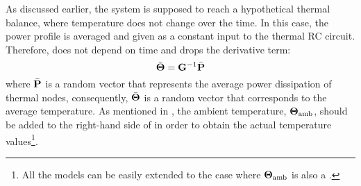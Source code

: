 As discussed earlier, the system is supposed to reach a hypothetical thermal balance, where temperature does not change over the time. In this case, the power profile is averaged and given as a constant input to the thermal RC circuit. Therefore,  does not depend on time and drops the derivative term:
\begin{equation} \equlabel{sss-fourier}
  \a{\vtemperature} = \mconductance^{-1} \a{\vpower}
\end{equation}
where $\bar{\mathbf{P}}$ is a random vector that represents the average power dissipation of thermal nodes, consequently, $\bar{\mathbf{\Theta}}$ is a random vector that corresponds to the average temperature. As mentioned in , the ambient temperature, $\mathbf{\Theta}_{\text{amb}}$, should be added to the right-hand side of  in order to obtain the actual temperature values\footnote{All the models can be easily extended to the case where $\mathbf{\Theta}_{\text{amb}}$ is also a \mnrv.}.

